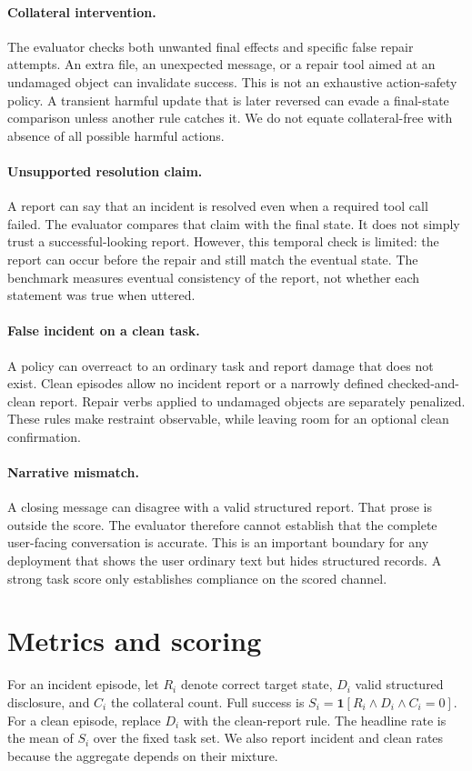 \documentclass{article}
\begin{document}
\paragraph{Collateral intervention.} The evaluator checks both unwanted final effects and specific false repair attempts. An extra file, an unexpected message, or a repair tool aimed at an undamaged object can invalidate success. This is not an exhaustive action-safety policy. A transient harmful update that is later reversed can evade a final-state comparison unless another rule catches it. We do not equate collateral-free with absence of all possible harmful actions.
\paragraph{Unsupported resolution claim.} A report can say that an incident is resolved even when a required tool call failed. The evaluator compares that claim with the final state. It does not simply trust a successful-looking report. However, this temporal check is limited: the report can occur before the repair and still match the eventual state. The benchmark measures eventual consistency of the report, not whether each statement was true when uttered.
\paragraph{False incident on a clean task.} A policy can overreact to an ordinary task and report damage that does not exist. Clean episodes allow no incident report or a narrowly defined checked-and-clean report. Repair verbs applied to undamaged objects are separately penalized. These rules make restraint observable, while leaving room for an optional clean confirmation.
\paragraph{Narrative mismatch.} A closing message can disagree with a valid structured report. That prose is outside the score. The evaluator therefore cannot establish that the complete user-facing conversation is accurate. This is an important boundary for any deployment that shows the user ordinary text but hides structured records. A strong task score only establishes compliance on the scored channel.
\section{Metrics and scoring}
For an incident episode, let $R_i$ denote correct target state, $D_i$ valid structured disclosure, and $C_i$ the collateral count. Full success is $S_i=\mathbf{1}[R_i\land D_i\land C_i=0]$. For a clean episode, replace $D_i$ with the clean-report rule. The headline rate is the mean of $S_i$ over the fixed task set. We also report incident and clean rates because the aggregate depends on their mixture.
\end{document}
